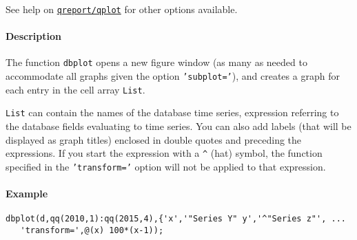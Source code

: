 See help on \href{qreport/qplot}{\texttt{qreport/qplot}} for other
options available.

\paragraph{Description}\label{description}

The function \texttt{dbplot} opens a new figure window (as many as
needed to accommodate all graphs given the option \texttt{'subplot='}),
and creates a graph for each entry in the cell array \texttt{List}.

\texttt{List} can contain the names of the database time series,
expression referring to the database fields evaluating to time series.
You can also add labels (that will be displayed as graph titles)
enclosed in double quotes and preceding the expressions. If you start
the expression with a \texttt{\^{}} (hat) symbol, the function specified
in the \texttt{'transform='} option will not be applied to that
expression.

\paragraph{Example}\label{example}

\begin{verbatim}
dbplot(d,qq(2010,1):qq(2015,4),{'x','"Series Y" y','^"Series z"', ...
   'transform=',@(x) 100*(x-1));
\end{verbatim}


